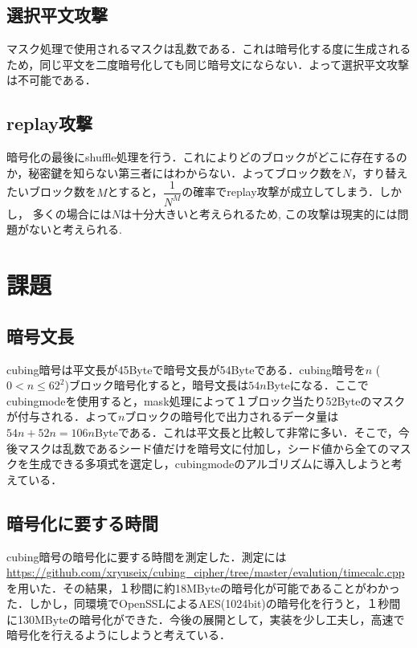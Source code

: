 \documentclass[titlepage]{jarticle}
\begin{document}
\subsection{選択平文攻撃}
マスク処理で使用されるマスクは乱数である．これは暗号化する度に生成されるため，同じ平文を二度暗号化しても同じ暗号文にならない．よって選択平文攻撃は不可能である．
\subsection{replay攻撃}
暗号化の最後にshuffle処理を行う．これによりどのブロックがどこに存在するのか，秘密鍵を知らない第三者にはわからない．よってブロック数を\(N\)，すり替えたいブロック数を\(M\)とすると，\(\dfrac{1}{N^M}\)の確率でreplay攻撃が成立してしまう．しかし， 多くの場合には\(N\)は十分大きいと考えられるため, この攻撃は現実的には問題がないと考えられる.

\section{課題}
\subsection{暗号文長}
cubing暗号は平文長が45Byteで暗号文長が54Byteである．cubing暗号を\(n\) (\(0 < n \leq 62^2\))ブロック暗号化すると，暗号文長は\(54n\)Byteになる．ここでcubingmodeを使用すると，mask処理によって１ブロック当たり52Byteのマスクが付与される．よって\(n\)ブロックの暗号化で出力されるデータ量は\(54n+52n=106n\)Byteである．これは平文長と比較して非常に多い．そこで，今後マスクは乱数であるシード値だけを暗号文に付加し，シード値から全てのマスクを生成できる多項式を選定し，cubingmodeのアルゴリズムに導入しようと考えている．

\subsection{暗号化に要する時間}
cubing暗号の暗号化に要する時間を測定した．測定には\url{https://github.com/xryuseix/cubing_cipher/tree/master/evalution/timecalc.cpp}を用いた．その結果，１秒間に約18MByteの暗号化が可能であることがわかった．しかし，同環境でOpenSSLによるAES(1024bit)の暗号化を行うと，１秒間に130MByteの暗号化ができた．今後の展開として，実装を少し工夫し，高速で暗号化を行えるようにしようと考えている．
\end{document}
